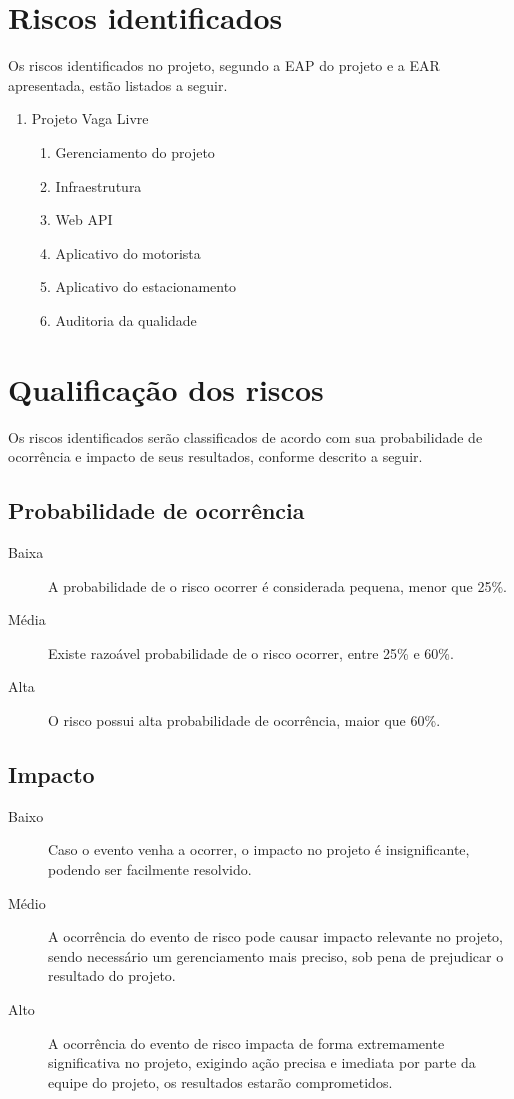 \section{Riscos identificados}

Os riscos identificados no projeto, segundo a EAP do projeto e a EAR apresentada, estão listados a seguir.

\begin{enumerate}
\item Projeto Vaga Livre
\begin{enumerate}
\item Gerenciamento do projeto
\item Infraestrutura
\item Web API
\item Aplicativo do motorista
\item Aplicativo do estacionamento
\item Auditoria da qualidade
\end{enumerate}
\end{enumerate}

\section{Qualificação dos riscos}

Os riscos identificados serão classificados de acordo com sua probabilidade de ocorrência e impacto de seus resultados, conforme descrito a seguir.

\subsection{Probabilidade de ocorrência}

\begin{description}
\item [Baixa] A probabilidade de o risco ocorrer é considerada pequena, menor que 25\%.
\item [Média] Existe razoável probabilidade de o risco ocorrer, entre 25\% e 60\%.
\item [Alta] O risco possui alta probabilidade de ocorrência, maior que 60\%. 
\end{description}

\subsection{Impacto}

\begin{description}
\item [Baixo] Caso o evento venha a ocorrer, o impacto no projeto é insignificante, podendo ser facilmente resolvido.
\item [Médio] A ocorrência do evento de risco pode causar impacto relevante no projeto, sendo necessário um gerenciamento mais preciso, sob pena de prejudicar o resultado do projeto.
\item [Alto] A ocorrência do evento de risco impacta de forma extremamente significativa no projeto, exigindo ação precisa e imediata por parte da equipe do projeto, os resultados estarão comprometidos.
\end{description}

